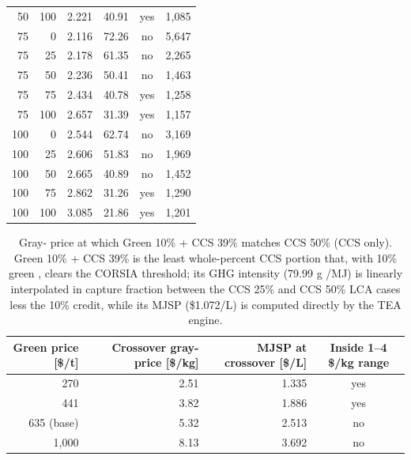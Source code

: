 \documentclass[11pt]{article}
\begin{document}
\begin{table}[htbp]
\begin{tabular}{@{}rrrrcr@{}}
    50 & 100 & 2.221 & 40.91 & yes & 1,085 \\
    75 & 0 & 2.116 & 72.26 & no & 5,647 \\
    75 & 25 & 2.178 & 61.35 & no & 2,265 \\
    75 & 50 & 2.236 & 50.41 & no & 1,463 \\
    75 & 75 & 2.434 & 40.78 & yes & 1,258 \\
    75 & 100 & 2.657 & 31.39 & yes & 1,157 \\
    100 & 0 & 2.544 & 62.74 & no & 3,169 \\
    100 & 25 & 2.606 & 51.83 & no & 1,969 \\
    100 & 50 & 2.665 & 40.89 & no & 1,452 \\
    100 & 75 & 2.862 & 31.26 & yes & 1,290 \\
    100 & 100 & 3.085 & 21.86 & yes & 1,201 \\
    \bottomrule
  \end{tabular}
\end{table}

\begin{table}[htbp]
  \centering
  \caption{Gray-\Htwo{} price at which Green \NHthree{} 10\% + CCS 39\% matches CCS 50\% (CCS only). Green \NHthree{} 10\% + CCS 39\% is the least whole-percent CCS portion that, with 10\% green \NHthree{}, clears the CORSIA threshold; its GHG intensity (79.99 g \COtwoe/MJ) is linearly interpolated in capture fraction between the CCS 25\% and CCS 50\% LCA cases less the 10\% \NHthree{} credit, while its MJSP (\$1.072/L) is computed directly by the TEA engine.}
  \label{tab:S9-5}
  \small
  \begin{tabular}{@{}rrrc@{}}
    \toprule
    Green \NHthree{} price [\$/t] & Crossover gray-\Htwo{} price [\$/kg] & MJSP at crossover [\$/L] & Inside 1--4 \$/kg range \\
    \midrule
    270 & 2.51 & 1.335 & yes \\
    441 & 3.82 & 1.886 & yes \\
    635 (base) & 5.32 & 2.513 & no \\
    1,000 & 8.13 & 3.692 & no \\
    \bottomrule
  \end{tabular}
\end{table}
\end{document}
